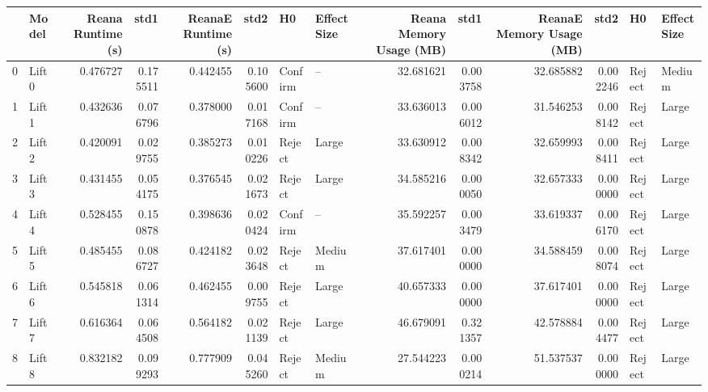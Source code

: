 \begin{tabular}{llrrrrllrrrrll}
\toprule
{} &    Model &  Reana Runtime (s) &      std1 &  ReanaE Runtime (s) &      std2 &       H0 & Effect Size &  Reana Memory Usage (MB) &       std1 &  ReanaE Memory Usage (MB) &       std2 &       H0 & Effect Size \\
\midrule
0  &   Lift 0 &           0.476727 &  0.175511 &            0.442455 &  0.105600 &  Confirm &          -- &                32.681621 &   0.003758 &                 32.685882 &   0.002246 &   Reject &      Medium \\
1  &   Lift 1 &           0.432636 &  0.076796 &            0.378000 &  0.017168 &  Confirm &          -- &                33.636013 &   0.006012 &                 31.546253 &   0.008142 &   Reject &       Large \\
2  &   Lift 2 &           0.420091 &  0.029755 &            0.385273 &  0.010226 &   Reject &       Large &                33.630912 &   0.008342 &                 32.659993 &   0.008411 &   Reject &       Large \\
3  &   Lift 3 &           0.431455 &  0.054175 &            0.376545 &  0.021673 &   Reject &       Large &                34.585216 &   0.000050 &                 32.657333 &   0.000000 &   Reject &       Large \\
4  &   Lift 4 &           0.528455 &  0.150878 &            0.398636 &  0.020424 &  Confirm &          -- &                35.592257 &   0.003479 &                 33.619337 &   0.006170 &   Reject &       Large \\
5  &   Lift 5 &           0.485455 &  0.086727 &            0.424182 &  0.023648 &   Reject &      Medium &                37.617401 &   0.000000 &                 34.588459 &   0.008074 &   Reject &       Large \\
6  &   Lift 6 &           0.545818 &  0.061314 &            0.462455 &  0.009755 &   Reject &       Large &                40.657333 &   0.000000 &                 37.617401 &   0.000000 &   Reject &       Large \\
7  &   Lift 7 &           0.616364 &  0.064508 &            0.564182 &  0.021139 &   Reject &       Large &                46.679091 &   0.321357 &                 42.578884 &   0.004477 &   Reject &       Large \\
8  &   Lift 8 &           0.832182 &  0.099293 &            0.777909 &  0.045260 &   Reject &      Medium &                27.544223 &   0.000214 &                 51.537537 &   0.000000 &   Reject &       Large \\

\end{tabular}
